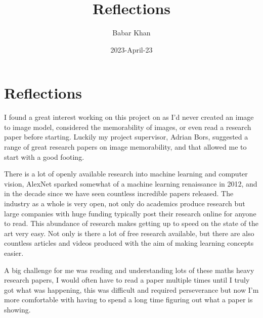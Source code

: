 \documentclass{UoYCSproject}
\author{Babar Khan}
\title{Reflections}
\date{2023-April-23}
\begin{document}

\chapter{Reflections}












I found a great interest working on this project on as I'd never created an image to image model, considered the memorability of images, or even read a research paper before starting. Luckily my project supervisor, Adrian Bors, suggested a range of great research papers on image memorability, and that allowed me to start with a good footing.

There is a lot of openly available research into machine learning and computer vision, AlexNet sparked somewhat of a machine learning renaissance in 2012, and in the decade since we have seen countless incredible papers released. The industry as a whole is very open, not only do academics produce research but large companies with huge funding typically post their research online for anyone to read. This abundance of research makes getting up to speed on the state of the art very easy. Not only is there a lot of free research available, but there are also countless articles and videos produced with the aim of making learning concepts easier. 

A big challenge for me was reading and understanding lots of these maths heavy research papers, I would often have to read a paper multiple times until I truly got what was happening, this was difficult and required perseverance but now I'm more comfortable with having to spend a long time figuring out what a paper is showing.
\end{document}
